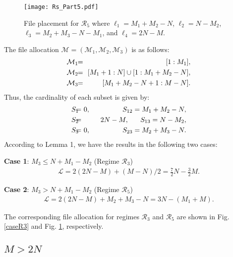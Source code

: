 \documentclass[conference]{IEEEtran}
\begin{document}
\begin{figure}[!b] \centering %
\texttt{[image: Rs\_Part5.pdf]}\vspace{-0.2in}
\caption{File placement for ${\mathcal R}_5$ where ${\ell}_1=M_1+M_2-N$, ${\ell}_2=N-M_2$, ${\ell}_3=M_2+M_3-N-M_1$, and ${\ell}_4=2N-M$.}\label{caseR5}\vspace{-0.1in}
\end{figure}

The file allocation $\mathcal{M}=(\mathcal{M}_1,\mathcal{M}_2,\mathcal{M}_3)$ is as follows:
\begin{eqnarray}
\mathcal{M}_1&\!\!=\!\!&[1:M_1],\notag\\
\mathcal{M}_2&\!\!=\!\!&[M_1+1:N]\cup [1:M_1+M_2-N],\\
\mathcal{M}_3&\!\!=\!\!&[M_1+M_2-N+1:M-N].\notag
\end{eqnarray}
Thus, the cardinality of each subset is given by:
\begin{eqnarray}
S_1&\!\!\!\!=\!\!\!\!&0,~~~~~~~~~~~~~~S_{12} = M_1+M_2-N,\notag\\
S_2&\!\!\!\!=\!\!\!\!&2N-M,~~~~~S_{13} = N-M_2,\\
S_3&\!\!\!\!=\!\!\!\!&0,~~~~~~~~~~~~~~S_{23} = M_2+M_3-N.\notag
\end{eqnarray}
According to Lemma 1, we have the results in the following two cases:

{\bf Case 1}: $M_3\leq  N+M_1-M_2$ (Regime $\mathcal{R}_3$)
\begin{eqnarray}
{\mathcal L}=2(2N-M)+(M-N)/2=\frac{7}{2}N-\frac{3}{2}M.
\end{eqnarray}

{\bf Case 2}: $M_3>N+M_1-M_2 $ (Regime $\mathcal{R}_5$)
\begin{eqnarray}
{\mathcal L}=2(2N\!-\!M)\!+\!M_2\!+\!M_3\!-\!N=3N-(M_1+M).
\end{eqnarray}

The corresponding file allocation for regimes $\mathcal{R}_3$ and $\mathcal{R}_5$ are shown in Fig. \ref{caseR3} and Fig. \ref{caseR5}, respectively.


\subsection{$M> 2N$}

\end{document}
